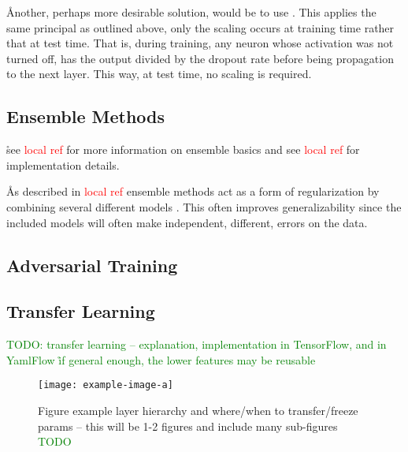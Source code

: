 
\r{Another, perhaps more desirable solution, would be to use . This applies the same principal as outlined above, only the scaling occurs at training time rather that at test time. That is, during training, any neuron whose activation was not turned off, has the output divided by the dropout rate before being propagation to the next layer.  This way, at test time, no scaling is required.}



\subsection{Ensemble Methods}

\r{see \textcolor{red}{local ref} for more information on ensemble basics and see \textcolor{red}{local ref} for implementation details.}

\r{As described in \textcolor{red}{local ref} ensemble methods act as a form of regularization by combining several different models . This often improves generalizability since the included models will often make independent, different, errors on the data.}

\subsection{Adversarial Training}



\subsection{Transfer Learning}


\textcolor{green}{TODO: transfer learning -- explanation, implementation in TensorFlow, and in YamlFlow \r{if general enough, the lower features may be reusable}}

\begin{figure}[htp]
	\centering
	\texttt{[image: example-image-a]}\hfil
	\caption{Figure example layer hierarchy and where/when to transfer/freeze params -- this will be 1-2 figures and include many sub-figures \textcolor{green}{TODO}}
	\label{fig:transfer_learning_subfigs_a}
\end{figure}

